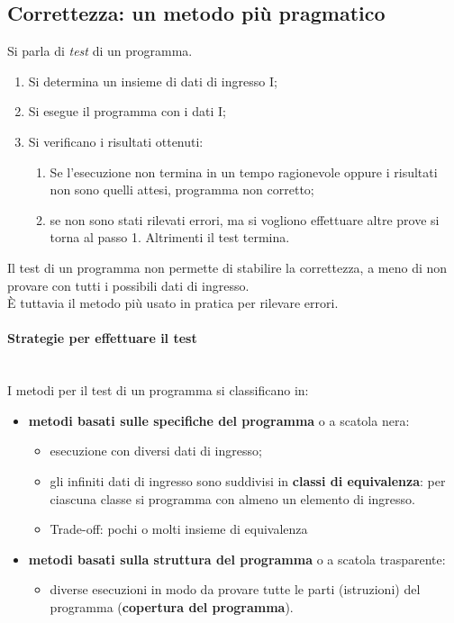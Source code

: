 \documentclass[12pt]{report}
\begin{document}
	\subsection{Correttezza: un metodo più pragmatico}
	Si parla di \textit{test} di un programma.
	\begin{enumerate}
		\item Si determina un insieme di dati di ingresso I;
		\item Si esegue il programma con i dati I;
		\item Si verificano i risultati ottenuti:
		\begin{enumerate}
			\item Se l'esecuzione non termina in un tempo ragionevole oppure i risultati non sono quelli attesi, programma non corretto;
			\item se non sono stati rilevati errori, ma si vogliono effettuare altre prove si torna al passo 1. Altrimenti il test termina.
		\end{enumerate}
	\end{enumerate}
	Il test di un programma non permette di stabilire la correttezza, a meno di non provare con tutti i possibili dati di ingresso. \\
	È tuttavia il metodo più usato in pratica per rilevare errori.
	\paragraph{Strategie per effettuare il test} \quad \\
	I metodi per il test di un programma si classificano in:
	\begin{itemize}
		\item \textbf{metodi basati sulle specifiche del programma} o a scatola nera:
		\begin{itemize}
			\item esecuzione con diversi dati di ingresso;
			\item gli infiniti dati di ingresso sono suddivisi in \textbf{classi di equivalenza}: per ciascuna classe si programma con almeno un elemento di ingresso.
			\item Trade-off: pochi o molti insieme di equivalenza
		\end{itemize}
		\item \textbf{metodi basati sulla struttura del programma} o a scatola trasparente:
		\begin{itemize}
			\item diverse esecuzioni in modo da provare tutte le parti (istruzioni) del programma (\textbf{copertura del programma}).
		\end{itemize}
	\end{itemize}
\end{document}
